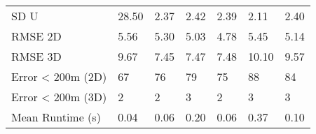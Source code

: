 \begin{longtable}{lllllll}
SD U              &      28.50 &       2.37 &      2.42 &     2.39 &     2.11 &        2.40 \\
RMSE 2D           &       5.56 &       5.30 &      5.03 &     4.78 &     5.45 &        5.14 \\
RMSE 3D           &       9.67 &       7.45 &      7.47 &     7.48 &    10.10 &        9.57 \\
Error < 200m (2D) &         67 &         76 &        79 &       75 &       88 &          84 \\
Error < 200m (3D) &          2 &          2 &         3 &        2 &        3 &           3 \\
Mean Runtime (s)  &       0.04 &       0.06 &      0.20 &     0.06 &     0.37 &        0.10 \\
\end{longtable}
